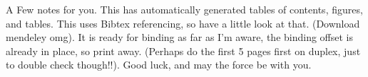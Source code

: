 A Few notes for you. This has automatically generated tables of contents, figures, and tables. This uses Bibtex referencing, so have a little look at that. (Download mendeley omg). It is ready for binding as far as I'm aware, the binding offset is already in place, so print away. (Perhaps do the first 5 pages first on duplex, just to double check though!!). Good luck, and may the force be with you.
